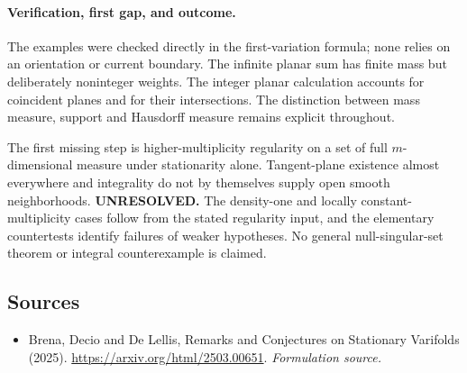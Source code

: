 \documentclass[11pt]{article}
\begin{document}
\paragraph{Verification, first gap, and outcome.}
The examples were checked directly in the first-variation
formula; none relies on an orientation or current
boundary. The infinite planar sum has finite mass
but deliberately noninteger weights. The integer
planar calculation accounts for coincident planes
and for their intersections. The distinction
between mass measure, support and Hausdorff
measure remains explicit throughout.

The first missing step is higher-multiplicity
regularity on a set of full $m$-dimensional
measure under stationarity alone. Tangent-plane
existence almost everywhere and integrality
do not by themselves supply open smooth
neighborhoods.
\textbf{UNRESOLVED.} The density-one and locally
constant-multiplicity cases follow from the
stated regularity input, and the elementary
countertests identify failures of weaker
hypotheses. No general null-singular-set theorem
or integral counterexample is claimed.

\subsection{Sources}
\begin{itemize}
\item[S1]Brena, Decio and De Lellis, Remarks and Conjectures on Stationary Varifolds (2025).
\url{https://arxiv.org/html/2503.00651}.
\textit{Formulation source.}
\end{itemize}
\end{document}
